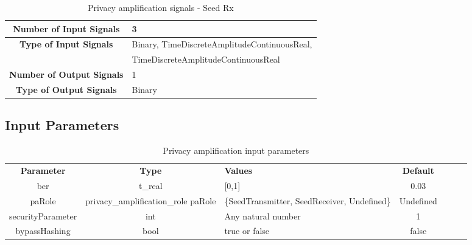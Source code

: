 \begin{table}[h]
	\begin{tabular}{|c|l|}
		\hline
		\textbf{Number of Input Signals} & 3 \\ \hline
        \textbf{Type of Input Signals} & Binary,
        TimeDiscreteAmplitudeContinuousReal,
	   \\
	   & TimeDiscreteAmplitudeContinuousReal \\ \hline
    	\textbf{Number of Output Signals} & 1 \ \\ \hline
        \textbf{Type of Output Signals} & Binary \\ \hline
	\end{tabular}
	\caption{Privacy amplification signals - Seed Rx}
	\label{table:privacy_amp_rx_signals}
\end{table}


\subsection*{Input Parameters}


\begin{table}[h]
	\centering
	\begin{tabular}{|c|c|p{40mm}|c|ccp{60mm}}
		\cline{1-4}
		\textbf{Parameter} & \textbf{Type} & \textbf{Values} &   \textbf{Default}& \\ \cline{1-4}
		ber 			& t\_real 		& [0,1] 		& 0.03 \\ \cline{1-4}
		paRole & privacy\_amplification\_role paRole & \{SeedTransmitter,
		SeedReceiver, Undefined\} & Undefined \\ \cline{1-4}
		securityParameter & int &  Any natural number & 1 \\ \cline{1-4}
		bypassHashing & bool & true or false & false \\ \cline{1-4}
	\end{tabular}
	\caption{Privacy amplification input parameters}
	\label{table:bin_sour_in_par}
\end{table}

